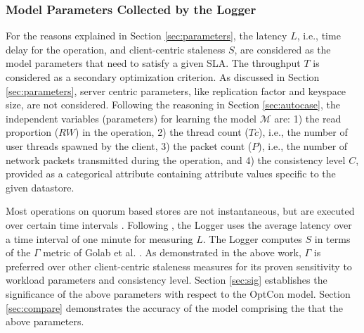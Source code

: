 \documentclass[conference]{IEEEtran}
\begin{document}
  \subsubsection{Model Parameters Collected by the Logger}\label{sec:logparam}
For the reasons explained in Section \ref{sec:parameters}, the latency $L$, i.e., time delay for the operation, and client-centric staleness $S$, are considered as the model parameters that need to satisfy a given SLA. The throughput $T$ is considered as a secondary optimization criterion. As discussed in Section \ref{sec:parameters}, server centric parameters, like replication factor and keyspace size, are not considered. Following the reasoning in Section \ref{sec:autocase}, the independent variables (parameters) for learning the model $\mathcal{M}$ are: 1) the read proportion ($\mathit{RW}$) in the operation, 2) the thread count ($\mathit{Tc}$), i.e., the number of user threads spawned by the client, 3) the packet count ($P$), i.e., the number of network packets  transmitted during the operation, and 4) the consistency level $C$, provided as a categorical attribute containing attribute values specific to the given datastore. \par Most operations on quorum based stores are not instantaneous, but are executed over certain time intervals \cite{DBLP:conf/cloud/GolabRAKWG13}. Following  \cite{Bailis:2012:PBS:2212351.2212359}, the Logger uses the average latency over a time  interval of one minute for measuring $L$.
The Logger computes $S$ in terms of the {\boldmath$\Gamma$} metric of Golab et al. \cite{DBLP:conf/cloud/GolabRAKWG13}. As demonstrated in the above work, {\boldmath$\Gamma$}  is preferred over other client-centric staleness measures for its proven sensitivity to workload parameters and consistency level. Section \ref{sec:sig} establishes the significance of the above parameters with respect to the OptCon model.
  Section \ref{sec:compare} demonstrates the accuracy of the model comprising the that the above parameters. 
\end{document}
